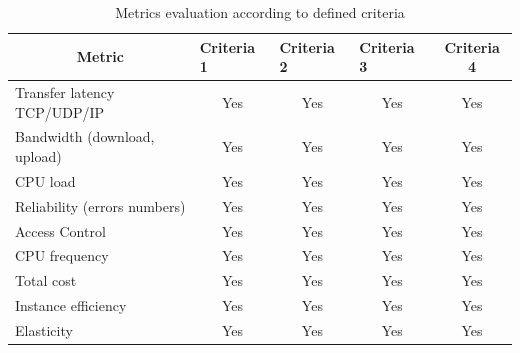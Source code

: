 \documentclass[conference]{IEEEtran}
\begin{document}
\begin{table}[]
\centering
\caption{Metrics evaluation according to defined criteria}
\label{tab:avaliacao_metricas}
\begin{tabular}{@{}lcccc@{}}
\toprule
\multicolumn{1}{c}{\textbf{Metric}}              & \multicolumn{1}{l}{\textbf{Criteria 1}} & \multicolumn{1}{l}{\textbf{Criteria 2}} & \multicolumn{1}{l}{\textbf{Criteria 3}} & \textbf{Criteria 4}         \\ \midrule
Transfer latency TCP/UDP/IP                & Yes                                     & Yes                                     & Yes                                     & Yes                         \\
Bandwidth (download, upload)               & Yes                                     & Yes                                     & Yes                                     & Yes                         \\
CPU load                                      & Yes                                     & Yes                                     & Yes                                     & Yes                         \\
Reliability (errors numbers)                  & Yes                                     & Yes                                     & Yes                                     & Yes                         \\
Access Control                                & Yes                                     & Yes                                     & Yes                                     & Yes                         \\
CPU frequency                                 & Yes                                     & Yes                                     & Yes                                     & Yes                         \\
Total cost                                       & Yes                                     & Yes                                     & Yes                                     & Yes                         \\
Instance efficiency                           & Yes                                     & Yes                                     & Yes                                     & Yes                         \\
Elasticity                                      & Yes                                     & Yes                                     & Yes                                     & Yes                         \\

\end{tabular}
\end{table}
\end{document}
